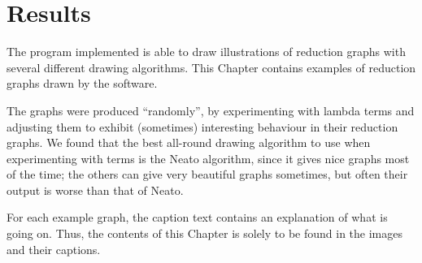 
\chapter{Results}
\newcommand{\exampleheight}{2.2in}

The program implemented is able to draw illustrations of reduction graphs with
several different drawing algorithms. This Chapter contains examples of reduction graphs
drawn by the software. 

The graphs were produced ``randomly'', by experimenting with lambda terms and
adjusting them to exhibit (sometimes) interesting behaviour in their reduction
graphs. We found that the best all-round drawing algorithm to use when
experimenting with terms is the Neato algorithm, since it gives nice graphs
most of the time; the others can give very beautiful graphs sometimes, but
often their output is worse than that of Neato.

For each example graph, the caption text contains an explanation of what is
going on. Thus, the contents of this Chapter is solely to be found in the
images and their captions.

